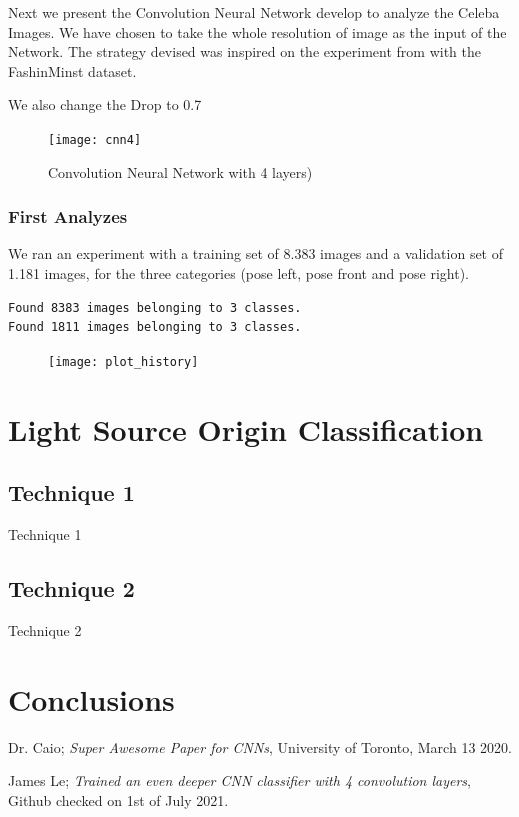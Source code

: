 \documentclass[oneside]{book}
\begin{document}
Next we present the Convolution Neural Network develop to analyze the Celeba Images. We have chosen to take the whole resolution of image as the input of the Network. The strategy devised was inspired on the experiment from \cite{4CNN} with the FashinMinst dataset.

We also change the Drop to 0.7

\begin{figure}[ht]
\caption{Convolution Neural Network with 4 layers)}
\texttt{[image: cnn4]}
\centering
\end{figure}


\subsection{First Analyzes}

We ran an experiment with a training set of 8.383 images and a validation set of 1.181 images, for the three categories (pose left, pose front and pose right).
\begin{small}
\begin{verbatim}
Found 8383 images belonging to 3 classes.
Found 1811 images belonging to 3 classes.
\end{verbatim}
\end{small}

\begin{figure}[ht]
\texttt{[image: plot\_history]}
\centering
\end{figure}


\chapter{Light Source Origin Classification}

\section{Technique 1}
Technique 1

\section{Technique 2}
Technique 2

\chapter{Conclusions}

\begin{thebibliography}{9}
Dr. Caio;
\textit{Super Awesome Paper for CNNs}, University of Toronto, March 13 2020.

James Le;
\textit{Trained an even deeper CNN classifier with 4 convolution layers}, Github checked on 1st of July 2021.


\end{thebibliography}
\end{document}
